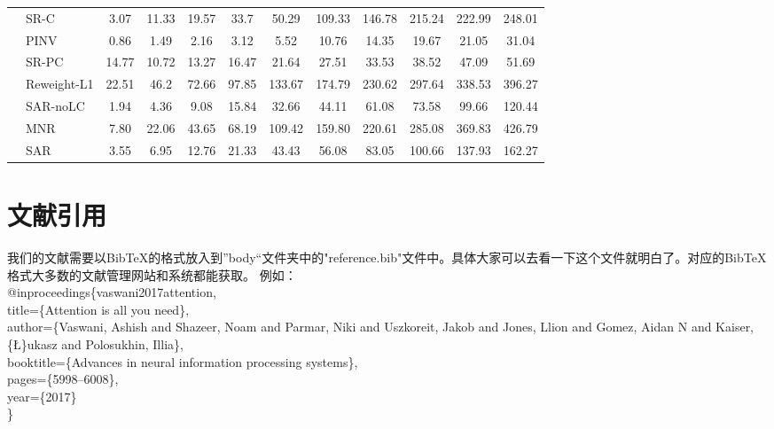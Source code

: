 \begin{table*}[htbp]
{\begin{tabular}{llcccccccccc}
  & SR-C & 3.07 & 11.33 & 19.57 & 33.7 & 50.29 & 109.33 & 146.78 & 215.24 & 222.99 & 248.01\\
  & PINV & 0.86 & 1.49 & 2.16 & 3.12 & 5.52 & 10.76 & 14.35 & 19.67 & 21.05 & 31.04\\
  & SR-PC & 14.77 & 10.72 & 13.27 & 16.47 & 21.64 & 27.51 & 33.53 & 38.52 & 47.09 & 51.69 \\
  & Reweight-L1 & 22.51 & 46.2 & 72.66 & 97.85 & 133.67 & 174.79 & 230.62 & 297.64 & 338.53 & 396.27 \\
  & SAR-noLC & 1.94 & 4.36 & 9.08 & 15.84 & 32.66 & 44.11 & 61.08 & 73.58 & 99.66 & 120.44 \\
  & \cellcolor[rgb]{.7,.8,.9}MNR & \cellcolor[rgb]{.7,.8,.9}7.80 & \cellcolor[rgb]{.7,.8,.9}22.06 & \cellcolor[rgb]{.7,.8,.9}43.65 & \cellcolor[rgb]{.7,.8,.9}68.19 & \cellcolor[rgb]{.7,.8,.9}109.42 & \cellcolor[rgb]{.7,.8,.9}159.80 & \cellcolor[rgb]{.7,.8,.9}220.61 & \cellcolor[rgb]{.7,.8,.9}285.08 & \cellcolor[rgb]{.7,.8,.9}369.83 & \cellcolor[rgb]{.7,.8,.9}426.79 \\
  & \cellcolor[rgb]{1,.9,.6}SAR & \cellcolor[rgb]{1,.9,.6}3.55 & \cellcolor[rgb]{1,.9,.6}6.95 & \cellcolor[rgb]{1,.9,.6}12.76 & \cellcolor[rgb]{1,.9,.6}21.33 & \cellcolor[rgb]{1,.9,.6}43.43 & \cellcolor[rgb]{1,.9,.6}56.08 & \cellcolor[rgb]{1,.9,.6}83.05 & \cellcolor[rgb]{1,.9,.6}100.66 & \cellcolor[rgb]{1,.9,.6}137.93 & \cellcolor[rgb]{1,.9,.6}162.27 \\
  \bottomrule
  \end{tabular}}
\end{table*}


\section{文献引用}
我们的文献需要以BibTeX的格式放入到”body“文件夹中的"reference.bib"文件中。具体大家可以去看一下这个文件就明白了。对应的BibTeX格式大多数的文献管理网站和系统都能获取。
例如：\\
@inproceedings\{vaswani2017attention,\\
  title=\{Attention is all you need\},\\
  author=\{Vaswani, Ashish and Shazeer, Noam and Parmar, Niki and Uszkoreit, Jakob and Jones, Llion and Gomez, Aidan N and Kaiser, \{\L\}ukasz and Polosukhin, Illia\},\\
  booktitle=\{Advances in neural information processing systems\},\\
  pages=\{5998--6008\},\\
  year=\{2017\}\\
\}

